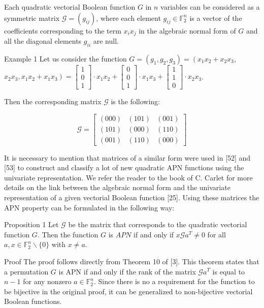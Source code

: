 \documentclass[10pt]{article}
\begin{document}
Each quadratic vectorial Boolean function $G$ in $n$ variables can be considered as a symmetric matrix $\mathcal{G}=\left(g_{i j}\right)$, where each element $g_{i j} \in \mathbb{F}_{2}^{n}$ is a vector of the coefficients corresponding to the term $x_{i} x_{j}$ in the algebraic normal form of $G$ and all the diagonal elements $g_{i i}$ are null.

Example 1 Let us consider the function $G=\left(g_{1}, g_{2}, g_{3}\right)=\left(x_{1} x_{2}+x_{2} x_{3}\right.$,\\
$\left.x_{2} x_{3}, x_{1} x_{2}+x_{1} x_{3}\right)=\left[\begin{array}{l}1 \\ 0 \\ 1\end{array}\right] \cdot x_{1} x_{2}+\left[\begin{array}{l}0 \\ 0 \\ 1\end{array}\right] \cdot x_{1} x_{3}+\left[\begin{array}{l}1 \\ 1 \\ 0\end{array}\right] \cdot x_{2} x_{3}$.

Then the corresponding matrix $\mathcal{G}$ is the following:

$$
\mathcal{G}=\left[\begin{array}{lll}
(000) & (101) & (001) \\
(101) & (000) & (110) \\
(001) & (110) & (000)
\end{array}\right]
$$

It is necessary to mention that matrices of a similar form were used in [52] and [53] to construct and classify a lot of new quadratic APN functions using the univariate representation. We refer the reader to the book of C. Carlet for more details on the link between the algebraic normal form and the univariate representation of a given vectorial Boolean function [25]. Using these matrices the APN property can be formulated in the following way:

Proposition 1 Let $\mathcal{G}$ be the matrix that corresponds to the quadratic vectorial function $G$. Then the function $G$ is $A P N$ if and only if $x \mathcal{G} a^{T} \neq 0$ for all $a, x \in \mathbb{F}_{2}^{n} \backslash\{0\}$ with $x \neq a$.

Proof The proof follows directly from Theorem 10 of [3]. This theorem states that a permutation $G$ is APN if and only if the rank of the matrix $\mathcal{G} a^{T}$ is equal to $n-1$ for any nonzero $a \in \mathbb{F}_{2}^{n}$. Since there is no a requirement for the function to be bijective in the original proof, it can be generalized to non-bijective vectorial Boolean functions.
\end{document}
